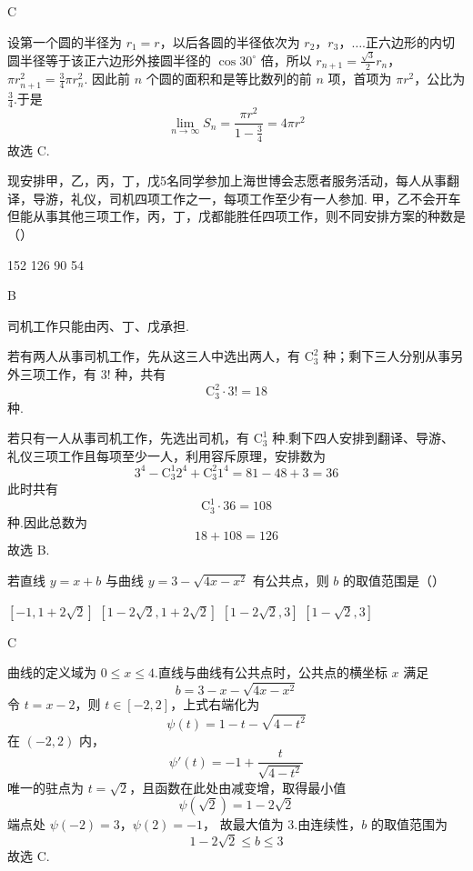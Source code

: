 \begin{answer}
C
\end{answer}

\begin{solution}
设第一个圆的半径为 \(r_1=r\)，以后各圆的半径依次为
\(r_2\)，\(r_3\)，\(\ldots\).正六边形的内切圆半径等于该正六边形外接圆半径的
\(\cos30^\circ\) 倍，所以
\(r_{n+1}=\frac{\sqrt3}{2}r_n\)，\(\pi r_{n+1}^2=\frac34\pi r_n^2\).
因此前 \(n\) 个圆的面积和是等比数列的前 \(n\) 项，首项为
\(\pi r^2\)，公比为 \(\frac34\).于是
\[
\lim_{n\to\infty}S_n
=\frac{\pi r^2}{1-\frac34}
=4\pi r^2
\]
故选 C.
\end{solution}

\begin{problem}
现安排甲，乙，丙，丁，戊5名同学参加上海世博会志愿者服务活动，每人从事翻译，导游，礼仪，司机四项工作之一，每项工作至少有一人参加. 甲，乙不会开车但能从事其他三项工作，丙，丁，戊都能胜任四项工作，则不同安排方案的种数是（\quad）

\choices
    {152}
    {126}
    {90}
    {54}
\end{problem}

\begin{answer}
B
\end{answer}

\begin{solution}
司机工作只能由丙、丁、戊承担.

若有两人从事司机工作，先从这三人中选出两人，有
\(\mathrm C_3^2\) 种；剩下三人分别从事另外三项工作，有 \(3!\) 种，共有
\[
\mathrm C_3^2\cdot3!=18
\]
种.

若只有一人从事司机工作，先选出司机，有 \(\mathrm C_3^1\) 种.剩下四人安排到翻译、导游、礼仪三项工作且每项至少一人，利用容斥原理，安排数为
\[
3^4-\mathrm C_3^1 2^4+\mathrm C_3^2 1^4
=81-48+3=36
\]
此时共有
\[
\mathrm C_3^1\cdot36=108
\]
种.因此总数为
\[
18+108=126
\]
故选 B.
\end{solution}

\begin{problem}
若直线 \( y = x + b \) 与曲线 \( y = 3 - \sqrt{4x - x^2} \) 有公共点，则 \( b \) 的取值范围是（\quad）

\choices
    {\([-1, 1 + 2\sqrt{2}]\)}
    {\([1 - 2\sqrt{2}, 1 + 2\sqrt{2}]\)}
    {\([1 - 2\sqrt{2},3]\)}
    {\([1 - \sqrt{2},3]\)}
\end{problem}

\begin{answer}
C
\end{answer}

\begin{solution}
曲线的定义域为 \(0\leqslant x\leqslant4\).直线与曲线有公共点时，公共点的横坐标 \(x\) 满足
\[
b=3-x-\sqrt{4x-x^2}
\]
令 \(t=x-2\)，则 \(t\in[-2,2]\)，上式右端化为
\[
\psi(t)=1-t-\sqrt{4-t^2}
\]
在 \((-2,2)\) 内，
\[
\psi'(t)=-1+\frac{t}{\sqrt{4-t^2}}
\]
唯一的驻点为 \(t=\sqrt2\)，且函数在此处由减变增，取得最小值
\[
\psi(\sqrt2)=1-2\sqrt2
\]
端点处
\(\psi(-2)=3\)，\(\psi(2)=-1\)，
故最大值为 \(3\).由连续性，\(b\) 的取值范围为
\[
1-2\sqrt2\leqslant b\leqslant3
\]
故选 C.
\end{solution}

